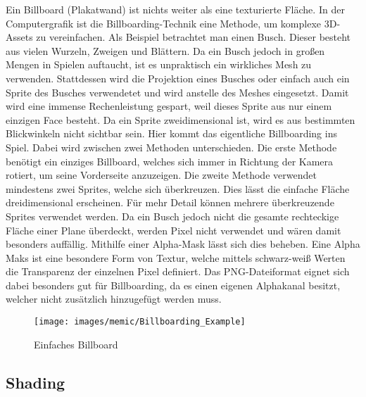 Ein Billboard (Plakatwand) ist nichts weiter als eine texturierte Fläche. In der Computergrafik ist die Billboarding-Technik eine Methode, um komplexe 3D-Assets zu vereinfachen. Als Beispiel betrachtet man einen Busch. Dieser besteht aus vielen Wurzeln, Zweigen und Blättern. Da ein Busch jedoch in großen Mengen in Spielen auftaucht, ist es unpraktisch ein wirkliches Mesh zu verwenden. Stattdessen wird die Projektion eines Busches oder einfach auch ein Sprite des Busches verwendetet und wird anstelle des Meshes eingesetzt. Damit wird eine immense Rechenleistung gespart, weil dieses Sprite aus nur einem einzigen Face besteht.\cite[48]{_the_essential_guide_to_3D} Da ein Sprite zweidimensional ist, wird es aus bestimmten Blickwinkeln nicht sichtbar sein. Hier kommt das eigentliche Billboarding ins Spiel. Dabei wird zwischen zwei Methoden unterschieden.
Die erste Methode benötigt ein einziges Billboard, welches sich immer in Richtung der Kamera rotiert, um seine Vorderseite anzuzeigen.
Die zweite Methode verwendet mindestens zwei Sprites, welche sich überkreuzen. Dies lässt die einfache Fläche dreidimensional erscheinen.  Für mehr Detail können mehrere überkreuzende Sprites verwendet werden.
Da ein Busch jedoch nicht die gesamte rechteckige Fläche einer Plane überdeckt, werden Pixel nicht verwendet und wären damit besonders auffällig. Mithilfe einer Alpha-Mask lässt sich dies beheben. Eine Alpha Maks ist eine besondere Form von Textur, welche mittels schwarz-weiß Werten die Transparenz der einzelnen Pixel definiert. Das PNG-Dateiformat eignet sich dabei besonders gut für Billboarding, da es einen eigenen Alphakanal besitzt, welcher nicht zusätzlich hinzugefügt werden muss.

\begin{figure}[H]
	\centering
	\texttt{[image: images/memic/Billboarding\_Example]}
	\caption{Einfaches Billboard}
	\end{figure}

\subsection{Shading}

